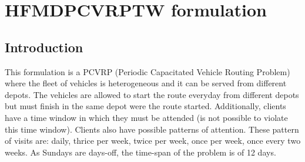 \documentclass[preprint,review,12pt]{elsarticle}
\begin{document}
\section{HFMDPCVRPTW formulation}

\subsection{Introduction}
This formulation is a PCVRP (Periodic Capacitated Vehicle Routing Problem) where the fleet of vehicles is heterogeneous and it can be served from different depots. The vehicles are allowed to start the route everyday from different depots but must finish in the same depot were the route started. Additionally, clients have a time window in which they must be attended (is not possible to violate this time window). Clients also have possible patterns of attention. These pattern of visits are: daily, thrice per week, twice per week, once per week, once every two weeks. As Sundays are days-off, the time-span of the problem is of 12 days.


\end{document}
